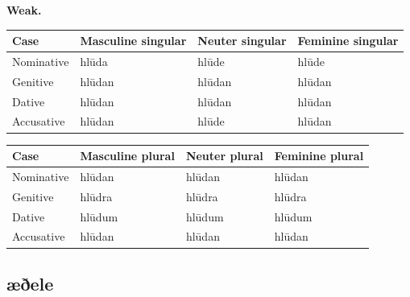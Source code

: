 \textbf{Weak.}

\par\begingroup
\fontsize{10.5}{13.2}\selectfont
\setlength{\LTleft}{0pt}\setlength{\LTright}{\fill}
\noindent
\begin{tabular}{@{}>{\raggedright\arraybackslash}p{22.0mm}>{\raggedright\arraybackslash}p{31.188mm}>{\raggedright\arraybackslash}p{31.188mm}>{\raggedright\arraybackslash}p{31.188mm}@{}}
\toprule
\textbf{Case} & \textbf{Masculine singular} & \textbf{Neuter singular} & \textbf{Feminine singular} \\
\midrule
Nominative & hlūda & hlūde & hlūde \\
Genitive & hlūdan & hlūdan & hlūdan \\
Dative & hlūdan & hlūdan & hlūdan \\
Accusative & hlūdan & hlūde & hlūdan \\
\bottomrule
\end{tabular}
\par\endgroup
\par\addvspace{5pt}
\par\begingroup
\fontsize{10.5}{13.2}\selectfont
\setlength{\LTleft}{0pt}\setlength{\LTright}{\fill}
\noindent
\begin{tabular}{@{}>{\raggedright\arraybackslash}p{22.0mm}>{\raggedright\arraybackslash}p{31.188mm}>{\raggedright\arraybackslash}p{31.188mm}>{\raggedright\arraybackslash}p{31.188mm}@{}}
\toprule
\textbf{Case} & \textbf{Masculine plural} & \textbf{Neuter plural} & \textbf{Feminine plural} \\
\midrule
Nominative & hlūdan & hlūdan & hlūdan \\
Genitive & hlūdra & hlūdra & hlūdra \\
Dative & hlūdum & hlūdum & hlūdum \\
Accusative & hlūdan & hlūdan & hlūdan \\
\bottomrule
\end{tabular}
\par\endgroup

\subsection*{æðele}

